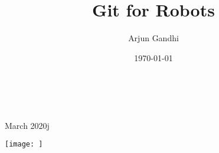 \documentclass{article}
\title{Git for Robots}
\author{Arjun Gandhi}
\date{\today}
\begin{document}
\begin{titlepage}
		\\
			
		\vspace{10mm}
		\\
		\vspace{\fill}
		\centering \large{March 2020}j
\end{titlepage}


\newpage{}
\thispagestyle {empty}

\vspace*{2cm}

\begin{center}
	\Large{\parbox{10cm}{
		\begin{raggedright}
		{
		\texttt{[image: ]}
		}
		\end{raggedright}
	}
}
\end{center}

\newpage
\end{document}
